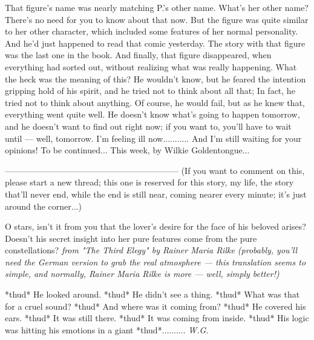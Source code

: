 That figure's name was nearly matching P.'s other name. 
What's her other name? There's no need for you to know about that now. 
But the figure was quite similar to her other character, which included some features of her normal personality. 
And he'd just happened to read that comic yesterday. 
The story with that figure was the last one in the book. 
And finally, that figure disappeared, when everything had sorted out, without realizing what was really happening. 
What the heck was the meaning of this?
He wouldn't know, but he feared the intention gripping hold of his spirit, and he tried not to think about all that; In fact, he tried not to think about anything. 
Of course, he would fail, but as he knew that, everything went quite well. 
He doesn't know what's going to happen tomorrow, and he doesn't want to find out right now; if you want to, you'll have to wait until --- well, tomorrow. 
I'm feeling ill now...........
And I'm still waiting for your opinions!
To be continued...
This week, by Wilkie Goldentongue...

--------------------------------------------------------------
(If you want to comment on this, please start a new thread; this one is reserved for this story, my life, the story that'll never end, while the end is still near, coming nearer every minute; it's just around the corner...)

O stars,
isn't it from you that the lover's desire for the face of his beloved arises? Doesn't 
his secret insight into her pure features come from the pure constellations?
\emph{from "The Third Elegy" by Rainer Maria Rilke (probably, you'll need the German version to grab the real atmosphere --- this translation seems to simple, and normally, Rainer Maria Rilke is more --- well, simply better!)}

*thud*
He looked around. 
*thud*
He didn't see a thing. 
*thud*
What was that for a cruel sound?
*thud*
And where was it coming from?
*thud*
He covered his ears. 
*thud*
It was still there. 
*thud*
It was coming from inside. 
*thud*
His logic was hitting his emotions in a giant 
*thud*..........
\emph{W.G.}

